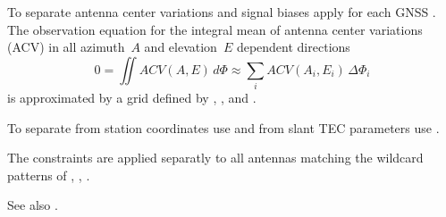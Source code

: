 To separate antenna center variations and signal biases
apply  for each GNSS .
The observation equation for the integral mean of antenna center variations (ACV)
in all azimuth~$A$ and elevation~$E$ dependent directions
\begin{equation}
  0 = \iint ACV(A,E)\, d\Phi \approx \sum_i ACV(A_i,E_i)\, \Delta\Phi_i
\end{equation}
is approximated by a grid defined by
, , and .

To separate from station coordinates use 
and from slant TEC parameters use .

The constraints are applied separatly to all antennas matching
the wildcard patterns of , , .

See also .



